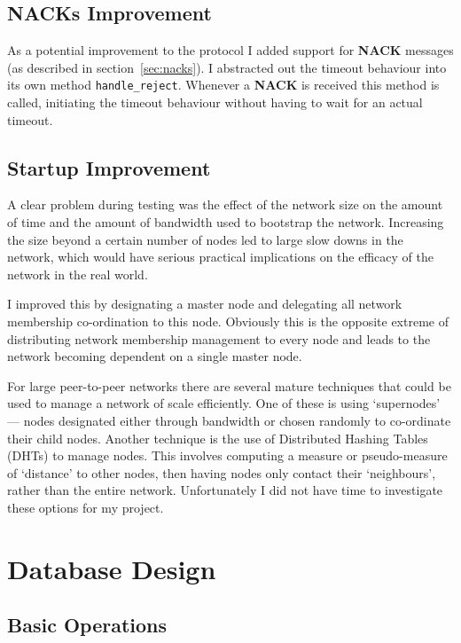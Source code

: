 \documentclass[12pt,twoside,notitlepage]{report}
\newcommand{\msg}[1] {{\bf #1}}         %
\begin{document}
\subsection{NACKs Improvement}

As a potential improvement to the protocol I added support for \msg{NACK} messages (as described
in section~\ref{sec:nacks}). I abstracted out the timeout behaviour into its own method
\verb|handle_reject|. Whenever a \msg{NACK} is received this method is called, initiating
the timeout behaviour without having to wait for an actual timeout.

\subsection{Startup Improvement}

A clear problem during testing was the effect of the network size on the amount of time and the
amount of bandwidth used to bootstrap the network. Increasing the size beyond a certain number of
nodes led to large slow downs in the network, which would have serious practical implications on
the efficacy of the network in the real world.

I improved this by designating a master node and delegating all network membership co-ordination
to this node. Obviously this is the opposite extreme of distributing network membership management
to every node and leads to the network becoming dependent on a single master node.

For large peer-to-peer networks there are several mature techniques that could be used to manage a
network of scale efficiently. One of these is using `supernodes' --- nodes designated either
through bandwidth or chosen randomly to co-ordinate their child nodes.  Another technique is the
use of Distributed Hashing Tables (DHTs) to manage nodes. This involves computing a measure or
pseudo-measure of `distance' to other nodes, then having nodes only contact their
`neighbours', rather than the entire network. Unfortunately I did not have time to investigate
these options for my project.

\section{Database Design}

\subsection{Basic Operations}
\end{document}
